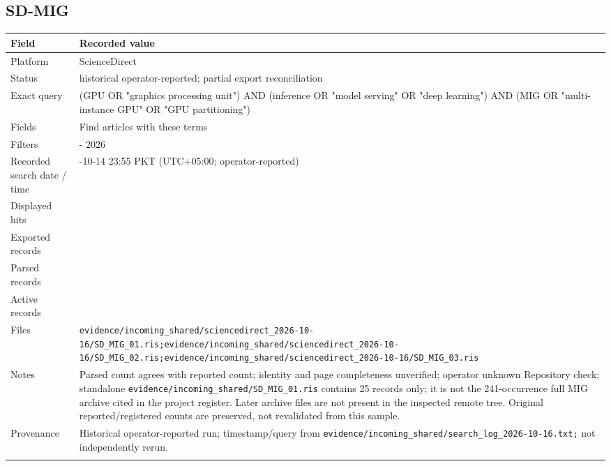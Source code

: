 \subsection{SD-MIG}

\begin{longtable}{>{\raggedright\arraybackslash}p{}>{\raggedright\arraybackslash}p{}}
\toprule
\textbf{Field} & \textbf{Recorded value}\\\midrule\endhead
Platform & ScienceDirect\\\addlinespace
Status & historical operator-reported; partial export reconciliation\\\addlinespace
Exact query & (GPU OR "graphics processing unit") AND (inference OR "model serving" OR "deep learning") AND (MIG OR "multi-instance GPU" OR "GPU partitioning")\\\addlinespace
Fields & Find articles with these terms\\\addlinespace
Filters & 2020 - 2026\\\addlinespace
Recorded search date / time & 2026-10-14 23:55 PKT (UTC+05:00; operator-reported)\\\addlinespace
Displayed hits & 241\\\addlinespace
Exported records & 241\\\addlinespace
Parsed records & 241\\\addlinespace
Active records & 241\\\addlinespace
Files & \nolinkurl{evidence/incoming_shared/sciencedirect_2026-10-16/SD_MIG_01.ris;evidence/incoming_shared/sciencedirect_2026-10-16/SD_MIG_02.ris;evidence/incoming_shared/sciencedirect_2026-10-16/SD_MIG_03.ris}\\\addlinespace
Notes & Parsed count agrees with reported count; identity and page completeness unverified; operator unknown Repository check: standalone \nolinkurl{evidence/incoming_shared/SD_MIG_01.ris} contains 25 records only; it is not the 241-occurrence full MIG archive cited in the project register. Later archive files are not present in the inspected remote tree. Original reported/registered counts are preserved, not revalidated from this sample.\\\addlinespace
Provenance & Historical operator-reported run; timestamp/query from \nolinkurl{evidence/incoming_shared/search_log_2026-10-16.txt;} not independently rerun.\\\addlinespace
\bottomrule\end{longtable}

